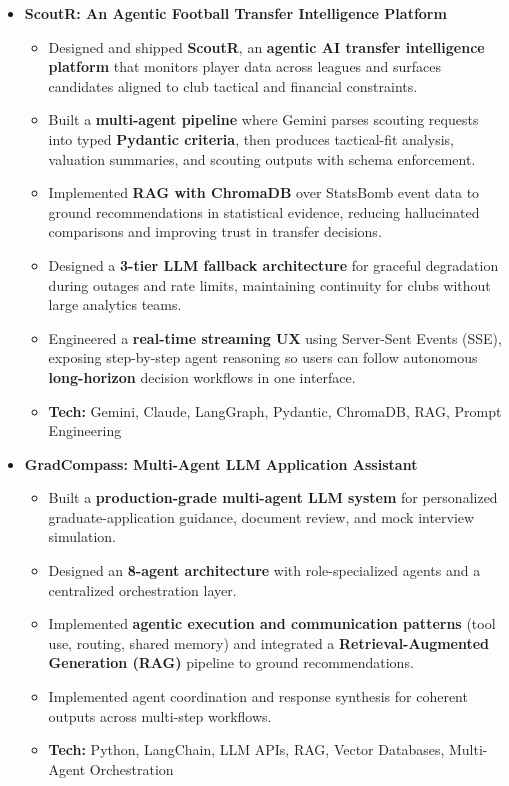 \documentclass[a4paper,11pt]{article}
\begin{document}
\begin{itemize}
  \item \textbf{ScoutR: An Agentic Football Transfer Intelligence Platform}
    \begin{itemize}[nosep, after=\strut, leftmargin=1.2em, itemsep=2pt]
      \item Designed and shipped \textbf{ScoutR}, an \textbf{agentic AI transfer intelligence platform} that monitors player data across leagues and surfaces candidates aligned to club tactical and financial constraints.
      \item Built a \textbf{multi-agent pipeline} where Gemini parses scouting requests into typed \textbf{Pydantic criteria}, then produces tactical-fit analysis, valuation summaries, and scouting outputs with schema enforcement.
      \item Implemented \textbf{RAG with ChromaDB} over StatsBomb event data to ground recommendations in statistical evidence, reducing hallucinated comparisons and improving trust in transfer decisions.
      \item Designed a \textbf{3-tier LLM fallback architecture} for graceful degradation during outages and rate limits, maintaining continuity for clubs without large analytics teams.
      \item Engineered a \textbf{real-time streaming UX} using Server-Sent Events (SSE), exposing step-by-step agent reasoning so users can follow autonomous \textbf{long-horizon} decision workflows in one interface.
      \item \textbf{Tech:} Gemini, Claude, LangGraph, Pydantic, ChromaDB, RAG, Prompt Engineering
    \end{itemize}

  \item \textbf{GradCompass: Multi-Agent LLM Application Assistant}
    \begin{itemize}[nosep, after=\strut, leftmargin=1.2em, itemsep=2pt]
      \item Built a \textbf{production-grade multi-agent LLM system} for personalized graduate-application guidance, document review, and mock interview simulation.
      \item Designed an \textbf{8-agent architecture} with role-specialized agents and a centralized orchestration layer.
      \item Implemented \textbf{agentic execution and communication patterns} (tool use, routing, shared memory) and integrated a \textbf{Retrieval-Augmented Generation (RAG)} pipeline to ground recommendations.
      \item Implemented agent coordination and response synthesis for coherent outputs across multi-step workflows.
      \item \textbf{Tech:} Python, LangChain, LLM APIs, RAG, Vector Databases, Multi-Agent Orchestration
    \end{itemize}


\end{itemize}
\end{document}
